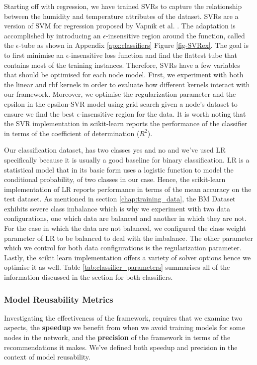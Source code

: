 \documentclass{mpaper}
\begin{document}
Starting off with regression, we have trained SVRs to capture the relationship between the humidity and temperature attributes of the dataset. SVRs are a version of SVM for regression proposed by Vapnik et al. \cite{OriginalSVR}. The adaptation is accomplished by introducing an $\epsilon$-insensitive region around the function, called the $\epsilon$-tube as shown in Appendix \ref{apx:classifiers} Figure \ref{fig-SVRex}. The goal is to first minimise an $\epsilon$-insensitive loss function and find the flattest tube that contains most of the training instances. Therefore, SVRs have a few variables that should be optimised for each node model. First, we experiment with both the linear and rbf kernels in order to evaluate how different kernels interact with our framework. Moreover, we optimise the regularization parameter and the epsilon in the epsilon-SVR model using grid search given a node's dataset to ensure we find the best $\epsilon$-insensitive region for the data. It is worth noting that the SVR implementation in scikit-learn reports the performance of the classifier in terms of the coefficient of determination ($R^2$). 

Our classification dataset, has two classes yes and no and we've used LR specifically because it is usually a good baseline for binary classification. LR \cite{OriginalLR} is a statistical model that in its basic form uses a logistic function to model the conditional probability, of two classes in our case. Hence, the scikit-learn implementation of LR reports performance in terms of the mean accuracy on the test dataset. As mentioned in section \ref{chap:training_data}, the BM Dataset exhibits severe class imbalance which is why we experiment with two data configurations, one which data are balanced and another in which they are not. For the case in which the data are not balanced, we configured the class weight parameter of LR to be balanced to deal with the imbalance. The other parameter which we control for both data configurations is the regularization parameter. Lastly, the scikit learn implementation offers a variety of solver options hence we optimise it as well. Table \ref{tab:classifier_parameters} summarises all of the information discussed in the section for both classifiers. 

\subsubsection{Model Reusability Metrics}\label{chap:metrics}

Investigating the effectiveness of the framework, requires that we examine two aspects, the \textbf{speedup} we benefit from when we avoid training models for some nodes in the network, and the \textbf{precision} of the framework in terms of the recommendations it makes. We've defined both speedup and precision in the context of model reusability.
\end{document}
